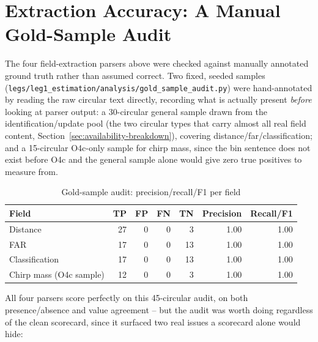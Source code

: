\section{Extraction Accuracy: A Manual Gold-Sample Audit}
\label{sec:gold-audit}

The four field-extraction parsers above were checked against manually annotated ground truth rather than assumed correct. Two fixed, seeded samples (\texttt{legs/leg1\_estimation/analysis/gold\_sample\_audit.py}) were hand-annotated by reading the raw circular text directly, recording what is actually present \emph{before} looking at parser output: a 30-circular general sample drawn from the identification/update pool (the two circular types that carry almost all real field content, Section~\ref{sec:availability-breakdown}), covering distance/\gls{far}/classification; and a 15-circular O4c-only sample for chirp mass, since the bin sentence does not exist before O4c and the general sample alone would give zero true positives to measure from.

\begin{table}[H]
\centering
\caption{Gold-sample audit: precision/recall/F1 per field}
\label{tab:gold-audit}
\begin{tabular}{@{}lrrrrrr@{}}
\toprule
Field & TP & FP & FN & TN & Precision & Recall/F1 \\
\midrule
Distance & 27 & 0 & 0 & 3 & 1.00 & 1.00 \\
FAR & 17 & 0 & 0 & 13 & 1.00 & 1.00 \\
Classification & 17 & 0 & 0 & 13 & 1.00 & 1.00 \\
Chirp mass (O4c sample) & 12 & 0 & 0 & 3 & 1.00 & 1.00 \\
\bottomrule
\end{tabular}
\end{table}

All four parsers score perfectly on this 45-circular audit, on both presence/absence and value agreement -- but the audit was worth doing regardless of the clean scorecard, since it surfaced two real issues a scorecard alone would hide:

